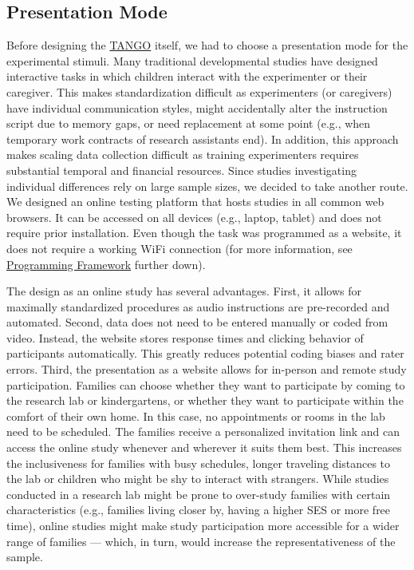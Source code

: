 \documentclass[
]{scrbook}
\begin{document}
\subsection{Presentation Mode}\label{presentationmode}

Before designing the \hyperref[acronyms_TANGO]{TANGO} itself, we had to choose a presentation mode for the experimental stimuli. Many traditional developmental studies have designed interactive tasks in which children interact with the experimenter or their caregiver. This makes standardization difficult as experimenters (or caregivers) have individual communication styles, might accidentally alter the instruction script due to memory gaps, or need replacement at some point (e.g., when temporary work contracts of research assistants end). In addition, this approach makes scaling data collection difficult as training experimenters requires substantial temporal and financial resources. Since studies investigating individual differences rely on large sample sizes, we decided to take another route. We designed an online testing platform that hosts studies in all common web browsers. It can be accessed on all devices (e.g., laptop, tablet) and does not require prior installation. Even though the task was programmed as a website, it does not require a working WiFi connection (for more information, see \hyperref[programmingframework]{Programming Framework} further down).

The design as an online study has several advantages. First, it allows for maximally standardized procedures as audio instructions are pre-recorded and automated. Second, data does not need to be entered manually or coded from video. Instead, the website stores response times and clicking behavior of participants automatically. This greatly reduces potential coding biases and rater errors. Third, the presentation as a website allows for in-person and remote study participation. Families can choose whether they want to participate by coming to the research lab or kindergartens, or whether they want to participate within the comfort of their own home. In this case, no appointments or rooms in the lab need to be scheduled. The families receive a personalized invitation link and can access the online study whenever and wherever it suits them best. This increases the inclusiveness for families with busy schedules, longer traveling distances to the lab or children who might be shy to interact with strangers. While studies conducted in a research lab might be prone to over-study families with certain characteristics (e.g., families living closer by, having a higher SES or more free time), online studies might make study participation more accessible for a wider range of families --- which, in turn, would increase the representativeness of the sample.
\end{document}
